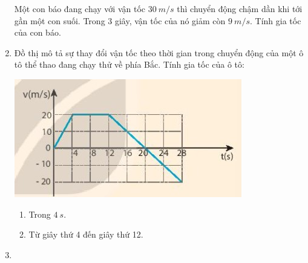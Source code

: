 \begin{enumerate}[label=\bfseries Câu \arabic*:]
	{
		
		Một con báo đang chạy với vận tốc $\SI{30}{m/s}$ thì chuyển động chậm dần khi tới gần một con suối. Trong 3 giây, vận tốc của nó giảm còn $\SI{9}{m/s}$. Tính gia tốc của con báo.
	}
		\item {}
	
	{
		
	Đồ thị mô tả sự thay đổi vận tốc theo thời gian trong chuyển động của một ô tô thể thao đang chạy thử về phía Bắc. Tính gia tốc của ô tô:
	\begin{center}
		\includegraphics[scale=1]{../figs/VN10-2022-PH-TP007-3.jpg}
	\end{center}
	
	\begin{enumerate}[label=\alph*)]
		\item Trong $\SI{4}{s}$.
		\item Từ giây thứ 4 đến giây thứ 12.
	\end{enumerate}
	}
		\item {}
	
	{
		
}
\end{enumerate}
